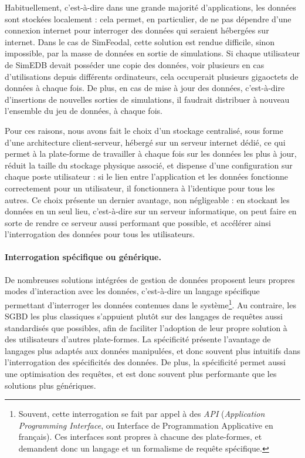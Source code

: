 Habituellement, c'est-à-dire dans une grande majorité d'applications, les données sont stockées localement : cela permet, en particulier, de ne pas dépendre d'une connexion internet pour interroger des données qui seraient hébergées sur internet.
Dans le cas de SimFeodal, cette solution est rendue difficile, sinon impossible, par la masse de données en sortie de simulations.
Si chaque utilisateur de SimEDB devait posséder une copie des données, voir plusieurs en cas d'utilisations depuis différents ordinateurs, cela occuperait plusieurs gigaoctets de données à chaque fois.
De plus, en cas de mise à jour des données, c'est-à-dire d'insertions de nouvelles sorties de simulations, il faudrait distribuer à nouveau l'ensemble du jeu de données, à chaque fois.

Pour ces raisons, nous avons fait le choix d'un stockage centralisé, sous forme d'une architecture \og client-serveur\fg{}, hébergé sur un serveur internet dédié, ce qui permet à la plate-forme de travailler à chaque fois sur les données les plus à jour, réduit la taille du stockage physique associé, et dispense d'une configuration sur chaque poste utilisateur :
si le lien entre l'application et les données fonctionne correctement pour un utilisateur, il fonctionnera à l'identique pour tous les autres.
Ce choix présente un dernier avantage, non négligeable :
en stockant les données en un seul lieu, c'est-à-dire sur un serveur informatique, on peut faire en sorte de rendre ce serveur aussi performant que possible, et accélérer ainsi l'interrogation des données pour tous les utilisateurs.

\paragraph{Interrogation spécifique ou générique.}\label{par:interrogation-generique}

De nombreuses solutions intégrées de gestion de données proposent leurs propres modes d'interaction avec les données, c'est-à-dire un langage spécifique permettant d'interroger les données contenues dans le système\footnote{
	Souvent, cette interrogation se fait par appel à des \textit{API} (\textit{Application Programming Interface}, ou Interface de Programmation Applicative en français).
	Ces interfaces sont propres à chacune des plate-formes, et demandent donc un langage et un formalisme de requête spécifique.
}.
Au contraire, les SGBD les plus classiques s'appuient plutôt sur des langages de requêtes aussi standardisés que possibles, afin de faciliter l'adoption de leur propre solution à des utilisateurs d'autres plate-formes.
La spécificité présente l'avantage de langages plus adaptés aux données manipulées, et donc souvent plus intuitifs dans l'interrogation des spécificités des données.
De plus, la spécificité permet aussi une optimisation des requêtes, et est donc souvent plus performante que les solutions plus génériques.

